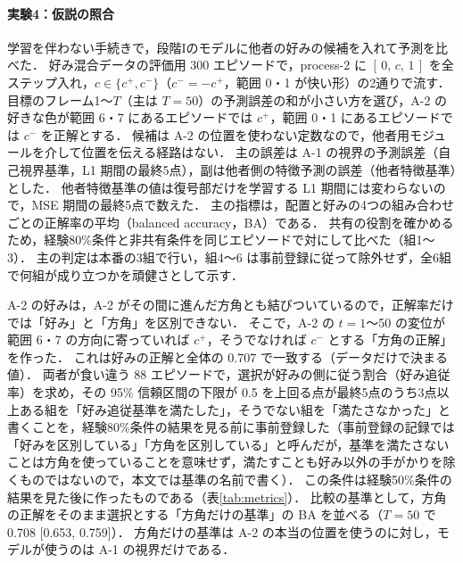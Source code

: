 \paragraph{実験4：仮説の照合}
学習を伴わない手続きで，段階Iのモデルに他者の好みの候補を入れて予測を比べた．
好み混合データの評価用 300 エピソードで，process-2 に $[\,0,\,c,\,1\,]$ を全ステップ入れ，$c\in\{c^{+},c^{-}\}$（$c^{-}=-c^{+}$，範囲 0・1 が快い形）の2通りで流す．
目標のフレーム1〜$T$（主は $T=50$）の予測誤差の和が小さい方を選び，A-2 の好きな色が範囲 6・7 にあるエピソードでは $c^{+}$，範囲 0・1 にあるエピソードでは $c^{-}$ を正解とする．
候補は A-2 の位置を使わない定数なので，他者用モジュールを介して位置を伝える経路はない．
主の誤差は A-1 の視界の予測誤差（自己視界基準，L1 期間の最終5点），副は他者側の特徴予測の誤差（他者特徴基準）とした．
他者特徴基準の値は復号部だけを学習する L1 期間には変わらないので，MSE 期間の最終5点で数えた．
主の指標は，配置と好みの4つの組み合わせごとの正解率の平均（balanced accuracy，BA）である．
共有の役割を確かめるため，経験80\%条件と非共有条件を同じエピソードで対にして比べた（組1〜3）．
主の判定は本番の3組で行い，組4〜6 は事前登録に従って除外せず，全6組で何組が成り立つかを頑健さとして示す．

A-2 の好みは，A-2 がその間に進んだ方角とも結びついているので，正解率だけでは「好み」と「方角」を区別できない．
そこで，A-2 の $t=1$〜50 の変位が範囲 6・7 の方向に寄っていれば $c^{+}$，そうでなければ $c^{-}$ とする「方角の正解」を作った．
これは好みの正解と全体の 0.707 で一致する（データだけで決まる値）．
両者が食い違う 88 エピソードで，選択が好みの側に従う割合（好み追従率）を求め，その 95\% 信頼区間の下限が 0.5 を上回る点が最終5点のうち3点以上ある組を「好み追従基準を満たした」，そうでない組を「満たさなかった」と書くことを，経験80\%条件の結果を見る前に事前登録した（事前登録の記録では「好みを区別している」「方角を区別している」と呼んだが，基準を満たさないことは方角を使っていることを意味せず，満たすことも好み以外の手がかりを除くものではないので，本文では基準の名前で書く）．
この条件は経験50\%条件の結果を見た後に作ったものである（表\ref{tab:metrics}）．
比較の基準として，方角の正解をそのまま選択とする「方角だけの基準」の BA を並べる（$T=50$ で 0.708 [0.653, 0.759]）．
方角だけの基準は A-2 の本当の位置を使うのに対し，モデルが使うのは A-1 の視界だけである．